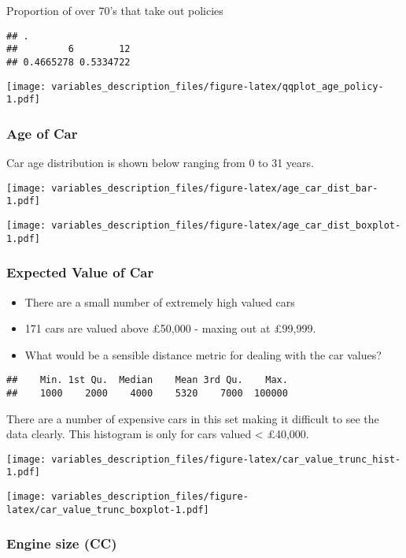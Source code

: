 \documentclass[]{article}
\providecommand{\tightlist}{%
  \setlength{\itemsep}{0pt}\setlength{\parskip}{0pt}}
\begin{document}
Proportion of over 70's that take out policies

\begin{verbatim}
## .
##         6        12 
## 0.4665278 0.5334722
\end{verbatim}

\texttt{[image: variables\_description\_files/figure-latex/qqplot\_age\_policy-1.pdf]}

\subsubsection{Age of Car}\label{age-of-car}

Car age distribution is shown below ranging from 0 to 31 years.

\texttt{[image: variables\_description\_files/figure-latex/age\_car\_dist\_bar-1.pdf]}

\texttt{[image: variables\_description\_files/figure-latex/age\_car\_dist\_boxplot-1.pdf]}

\subsubsection{Expected Value of Car}\label{expected-value-of-car}

\begin{itemize}
\tightlist
\item
  There are a small number of extremely high valued cars
\item
  171 cars are valued above £50,000 - maxing out at £99,999.
\item
  What would be a sensible distance metric for dealing with the car
  values?
\end{itemize}

\begin{verbatim}
##    Min. 1st Qu.  Median    Mean 3rd Qu.    Max. 
##    1000    2000    4000    5320    7000  100000
\end{verbatim}

There are a number of expensive cars in this set making it difficult to
see the data clearly. This histogram is only for cars valued \textless{}
£40,000.

\texttt{[image: variables\_description\_files/figure-latex/car\_value\_trunc\_hist-1.pdf]}

\texttt{[image: variables\_description\_files/figure-latex/car\_value\_trunc\_boxplot-1.pdf]}

\subsubsection{Engine size (CC)}\label{engine-size-cc}
\end{document}
